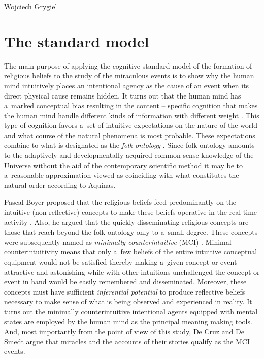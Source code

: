 \begin{artengenv}{Wojciech Grygiel}
\section*{The standard model}
The main purpose of applying the cognitive standard model of the formation of religious beliefs to the study of the miraculous events is to show why the human mind intuitively places an intentional agency as the cause of an event when its direct physical cause remains hidden. It turns out that the human mind has a~marked conceptual bias resulting in the content – specific cognition that makes the human mind handle different kinds of information with different weight
\parencite[][pp.35–39]{barrett_cognitive_2011}. %
 This type of cognition favors a~set of intuitive expectations on the nature of the world and what course of the natural phenomena is most probable. These expectations combine to what is designated as the \textit{folk ontology} 
\parencite[e.g.][pp.58–95]{barrett_cognitive_2011}. %
 Since folk ontology amounts to the adaptively and developmentally acquired common sense knowledge of the Universe without the aid of the contemporary scientific method it may be to a~reasonable approximation viewed as coinciding with what constitutes the natural order according to Aquinas.

Pascal Boyer proposed that the religious beliefs feed predominantly on the intuitive (non-reflective) concepts to make these beliefs operative in the real-time activity
\parencite[][]{boyer_religion_2001}. %
 Also, he argued that the quickly disseminating religious concepts are those that reach beyond the folk ontology only to a~small degree. These concepts were subsequently named as \textit{minimally counterintuitive} (MCI) 
\parencite[][]{barrett_exploring_2000}. %
 Minimal counterintuitivity means that only a~few beliefs of the entire intuitive conceptual equipment would not be satisfied thereby making a~given concept or event attractive and astonishing while with other intuitions unchallenged the concept or event in hand would be easily remembered and disseminated. Moreover, these concepts must have sufficient \textit{inferential potential} to produce reflective beliefs necessary to make sense of what is being observed and experienced in reality. It turns out the minimally counterintuitive intentional agents equipped with mental states are employed by the human mind as the principal meaning making tools. And, most importantly from the point of view of this study, De Cruz and De Smedt 
\parencite*[][pp.161–165]{de_cruz_natural_2015} %
 argue that miracles and the accounts of their stories qualify as the MCI events.


\end{artengenv}
